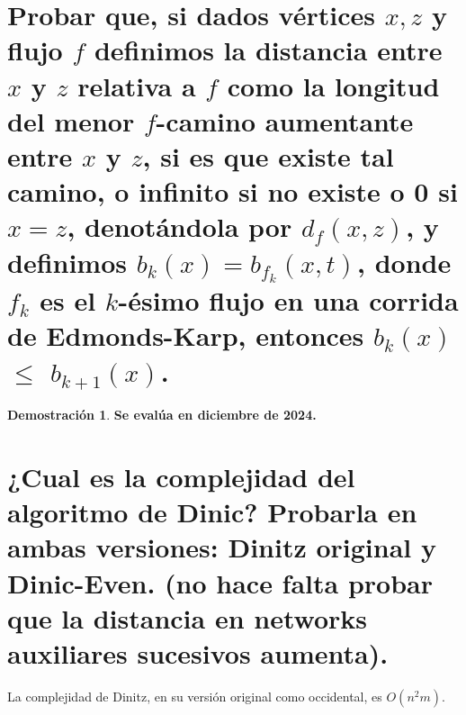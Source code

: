 \documentclass[11pt, a4paper]{article}
\theoremstyle{definition}
\newtheorem*{demostracion}{Demostración}
\begin{document}
\section{Probar que, si dados vértices $x,z$ y flujo $f$ definimos la distancia entre $x$ y $z$ relativa a $f$ como la longitud del menor
        $f$-camino aumentante entre $x$ y $z$, si es que existe tal camino, o infinito si no existe o 0 si $x=z$, denotándola por $d_f(x,z)$,
        y definimos $b_k(x)=b_{f_k}(x,t)$, donde $f_k$ es el $k$-ésimo flujo en una corrida de Edmonds-Karp, entonces $b_k(x)$ $\leq$ $b_{k+1}(x)$.}

\begin{demostracion}
    \textbf{Se evalúa en diciembre de 2024.}
\end{demostracion}

\section{¿Cual es la complejidad del algoritmo de Dinic? Probarla en ambas versiones: Dinitz original y Dinic-Even. 
(no hace falta probar que la distancia en networks auxiliares sucesivos aumenta).}
La complejidad de Dinitz, en su versión original como occidental, es $O(n^2m)$.
\end{document}

